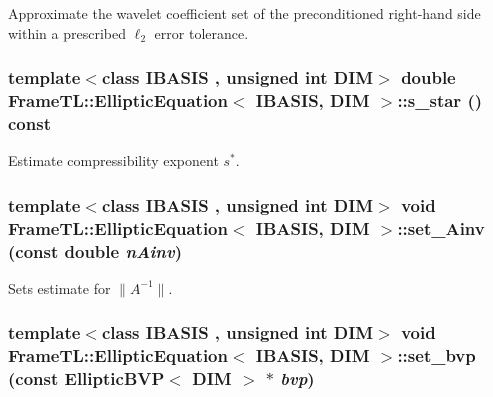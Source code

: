 Approximate the wavelet coefficient set of the preconditioned right-hand side within a prescribed $\ell_2$ error tolerance. \hypertarget{classFrameTL_1_1EllipticEquation_49aa28d722e5828e9ddf9d1bd57bff78}{
\subsubsection[{s\_\-star}]{\setlength{\rightskip}{0pt plus 5cm}template$<$class IBASIS , unsigned int DIM$>$ double {\bf FrameTL::EllipticEquation}$<$ IBASIS, DIM $>$::s\_\-star () const}}
\label{classFrameTL_1_1EllipticEquation_49aa28d722e5828e9ddf9d1bd57bff78}


Estimate compressibility exponent $s^\ast$. \hypertarget{classFrameTL_1_1EllipticEquation_556d174fe601791cb7b33264c7e7c4ec}{
\subsubsection[{set\_\-Ainv}]{\setlength{\rightskip}{0pt plus 5cm}template$<$class IBASIS , unsigned int DIM$>$ void {\bf FrameTL::EllipticEquation}$<$ IBASIS, DIM $>$::set\_\-Ainv (const double {\em nAinv})}}
\label{classFrameTL_1_1EllipticEquation_556d174fe601791cb7b33264c7e7c4ec}


Sets estimate for $\|A^{-1}\|$. \hypertarget{classFrameTL_1_1EllipticEquation_c7183c7aeb7e3c34cddf3c3e9a79b96c}{
\subsubsection[{set\_\-bvp}]{\setlength{\rightskip}{0pt plus 5cm}template$<$class IBASIS , unsigned int DIM$>$ void {\bf FrameTL::EllipticEquation}$<$ IBASIS, DIM $>$::set\_\-bvp (const EllipticBVP$<$ DIM $>$ $\ast$ {\em bvp})}}
\label{classFrameTL_1_1EllipticEquation_c7183c7aeb7e3c34cddf3c3e9a79b96c}


